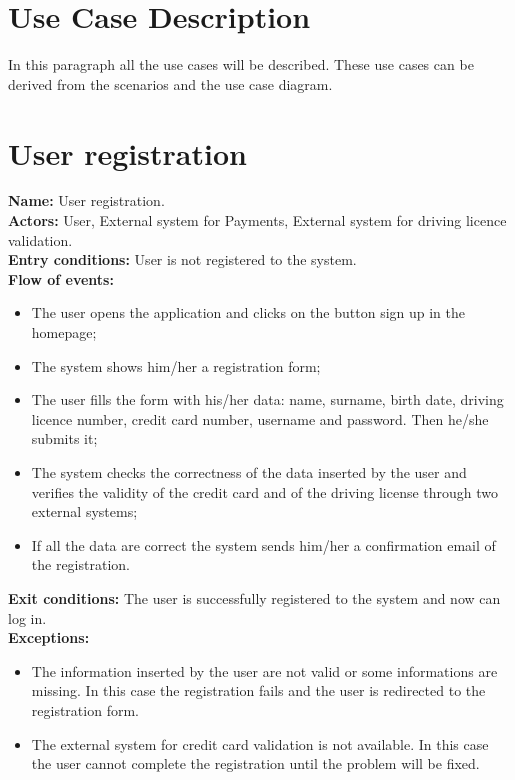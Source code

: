\section{Use Case Description}
In this paragraph all the use cases will be described. These use cases can be derived from the scenarios and the use case diagram.

\section*{User registration}
\textbf{Name:} User registration. \\
\textbf{Actors:} User, External system for Payments, External system for driving licence validation.\\
\textbf{Entry conditions:} User is not registered to the system.\\
\textbf{Flow of events:}
\begin{itemize}
\item The user opens the application and clicks on the button sign up in the homepage;
\item The system shows him/her a registration form;
\item The user fills the form with his/her data: name, surname, birth date, driving licence number, credit card number, username and password. Then he/she submits it;
\item The system checks the correctness of the data inserted by the user and verifies the validity of the credit card and of the driving license through two external systems;
\item If all the data are correct the system sends him/her a confirmation email of the registration.
\end{itemize}
\textbf{Exit conditions:} The user is successfully registered to the system and now can log in.\\
\textbf{Exceptions:}
\begin{itemize}
\item The information inserted by the user are not valid or some informations are missing.
In this case the registration fails and the user is redirected to the registration form.
\item The external system for credit card validation is not available. In this case the user cannot complete the registration until the problem will be fixed.
\end{itemize}


